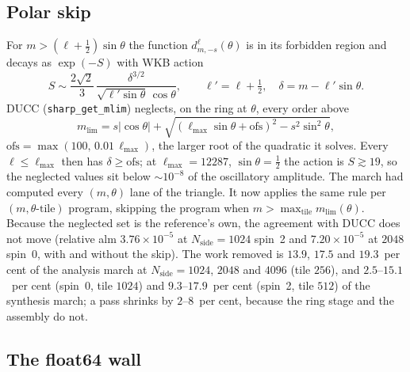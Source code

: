 \documentclass[usenatbib,useAMS]{mnras}
\begin{document}
\subsection{Polar skip}
\label{sec:polar}

For $m>(\ell+\tfrac12)\sin\theta$ the function $d^\ell_{m,-s}(\theta)$ is in its forbidden region and decays as $\exp(-S)$ with WKB action
\begin{equation}
\label{eq:wkb}
S\sim\frac{2\sqrt2}{3}\,\frac{\delta^{3/2}}{\sqrt{\ell'\sin\theta}\,\cos\theta},
\qquad \ell'=\ell+\tfrac12,\quad \delta=m-\ell'\sin\theta .
\end{equation}
DUCC (\texttt{sharp\_get\_mlim}) neglects, on the ring at $\theta$, every order above
\begin{equation}
\label{eq:mlim}
m_{\mathrm{lim}}=s\lvert\cos\theta\rvert+\sqrt{(\ell_{\max}\sin\theta+\mathrm{ofs})^2-s^2\sin^2\theta},
\end{equation}
$\mathrm{ofs}=\max(100,\,0.01\,\ell_{\max})$, the larger root of the quadratic it solves. Every $\ell\le\ell_{\max}$ then has $\delta\ge\mathrm{ofs}$; at $\ell_{\max}=12287$, $\sin\theta=\tfrac12$ the action is $S\gtrsim19$, so the neglected values sit below $\sim10^{-8}$ of the oscillatory amplitude. The march had computed every $(m,\theta)$ lane of the triangle. It now applies the same rule per $(m,\theta\text{-tile})$ program, skipping the program when $m>\max_{\mathrm{tile}}m_{\mathrm{lim}}(\theta)$. Because the neglected set is the reference's own, the agreement with DUCC does not move (relative alm $3.76\times10^{-5}$ at $N_{\mathrm{side}}=1024$ spin~2 and $7.20\times10^{-5}$ at $2048$ spin~0, with and without the skip). The work removed is $13.9$, $17.5$ and $19.3$~per cent of the analysis march at $N_{\mathrm{side}}=1024$, $2048$ and $4096$ (tile $256$), and $2.5$--$15.1$~per cent (spin~0, tile $1024$) and $9.3$--$17.9$~per cent (spin~2, tile $512$) of the synthesis march; a pass shrinks by $2$--$8$~per cent, because the ring stage and the assembly do not.

\subsection{The float64 wall}
\label{sec:wall}
\end{document}
